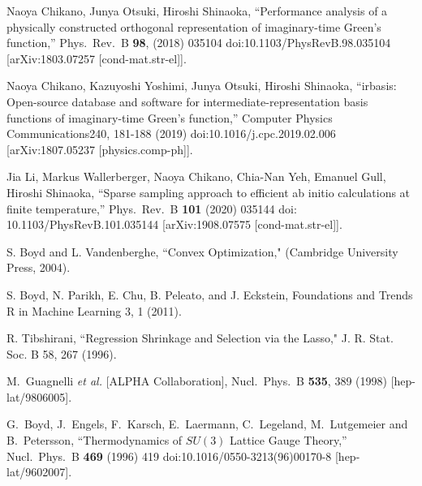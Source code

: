\documentclass[a4paper,11pt]{article}
\begin{document}
\begin{thebibliography}{99}
Naoya Chikano, Junya Otsuki, Hiroshi Shinaoka,
  ``Performance analysis of a physically constructed orthogonal representation of imaginary-time Green's function,''
 	Phys.\ Rev.\ B {\bf 98}, (2018) 035104 
 	doi:10.1103/PhysRevB.98.035104
 [arXiv:1803.07257 [cond-mat.str-el]].



Naoya Chikano, Kazuyoshi Yoshimi, Junya Otsuki, Hiroshi Shinaoka,
  ``irbasis: Open-source database and software for intermediate-representation basis functions of imaginary-time Green's function,''
 	Computer Physics Communications240, 181-188 (2019)
 	doi:10.1016/j.cpc.2019.02.006
 [arXiv:1807.05237 [physics.comp-ph]].



Jia Li, Markus Wallerberger, Naoya Chikano, Chia-Nan Yeh, Emanuel Gull, Hiroshi Shinaoka,
  ``Sparse sampling approach to efficient ab initio calculations at finite temperature,''
 	Phys.\ Rev.\ B {\bf 101} (2020) 035144
 	doi: 10.1103/PhysRevB.101.035144
 [arXiv:1908.07575 [cond-mat.str-el]].
 
 S. Boyd and L. Vandenberghe, ``Convex Optimization,"
(Cambridge University Press, 2004).
 
 S. Boyd, N. Parikh, E. Chu, B. Peleato, and J. Eckstein,
Foundations and Trends R in Machine Learning 3, 1 (2011).



  

 R. Tibshirani, 
 ``Regression Shrinkage and Selection via the Lasso,"
 J. R. Stat. Soc. B 58, 267 (1996).

  
  
   
  M.~Guagnelli {\it et al.}  [ALPHA Collaboration],
  Nucl.\ Phys.\ B {\bf 535}, 389 (1998)
  [hep-lat/9806005].
  
  G.~Boyd, J.~Engels, F.~Karsch, E.~Laermann, C.~Legeland, M.~Lutgemeier and B.~Petersson,
  ``Thermodynamics of $SU(3)$ Lattice Gauge Theory,''
  Nucl.\ Phys.\ B {\bf 469} (1996) 419
  doi:10.1016/0550-3213(96)00170-8
  [hep-lat/9602007].





\end{thebibliography}
\end{document}
